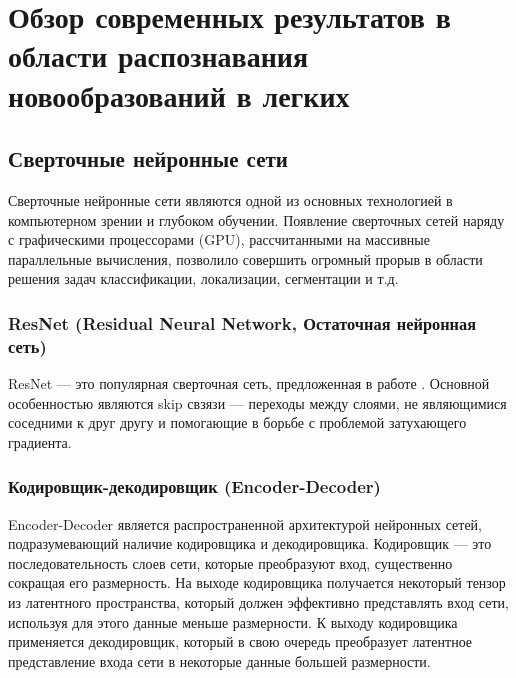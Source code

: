 \chapter{Обзор современных результатов в области распознавания новообразований в легких}

\startrelatedwork

\section{Сверточные нейронные сети} 

  

Сверточные нейронные сети являются одной из основных технологией в компьютерном зрении и глубоком обучении. Появление сверточных сетей наряду с графическими процессорами (GPU), рассчитанными на массивные параллельные вычисления, позволило совершить огромный прорыв в области решения задач классификации, локализации, сегментации и т.д. 

  

\subsection{ResNet (Residual Neural Network, Остаточная нейронная сеть)} 

  

ResNet --- это популярная сверточная сеть, предложенная в работе \cite{he2016deep}. Основной особенностью являются skip свзязи --- переходы между слоями, не являющимися соседними к друг другу и помогающие в борьбе с проблемой затухающего градиента. 

  

\subsection{Кодировщик-декодировщик (Encoder-Decoder)} 

  

Encoder-Decoder является распространенной архитектурой нейронных сетей, подразумевающий наличие кодировщика и декодировщика. Кодировщик --- это последовательность слоев сети, которые преобразуют вход, существенно сокращая его размерность. На выходе кодировщика получается некоторый тензор из латентного пространства, который должен эффективно представлять вход сети, используя для этого данные меньше размерности. К выходу кодировщика применяется декодировщик, который в свою очередь преобразует латентное представление входа сети в некоторые данные большей размерности. 

